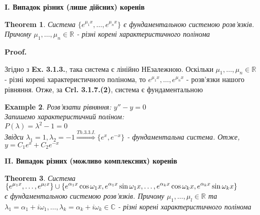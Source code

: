 \documentclass[a4paper, 10pt]{article}
\makeatletter
\def\qed{$\blacksquare$}
\theoremstyle{theoremdd}
\newtheorem{theorem}{Theorem}[subsection]
\theoremstyle{theoremdd}
\theoremstyle{theoremdd}
\theoremstyle{theoremdd}
\newtheorem{example}[theorem]{Example}
\theoremstyle{theoremdd}
\theoremstyle{theoremdd}
\theoremstyle{theoremdd}
\theoremstyle{theoremdd}
\renewenvironment{proof}[1][Proof.\\]{\par
\pushQED{\hfill \qed}%
\normalfont \topsep6\p@\@plus6\p@\relax
\trivlist
\item\relax
{\bfseries
#1\@addpunct{.}}\hspace\labelsep\ignorespaces
}{%
\popQED\endtrivlist\@endpefalse
}
\makeatother
\begin{document}
\textbf{I. Випадок різних (лише дійсних) коренів}
\begin{theorem}
 Система $\displaystyle \{e^{\mu_1 x}, \dots, e^{\mu_n x}\}$ є фундаментальною системою розв'язків. Причому $\mu_1, \dots, \mu_n \in \mathbb{R}$ - різні корені характеристичного полінома
\end{theorem}

\begin{proof}
Згідно з \textbf{Ex. 3.1.3.}, така система є лінійно НЕзалежною. Оскільки $\mu_1, \dots, \mu_n \in \mathbb{R}$ - різні корені характеристичного полінома, то $e^{\mu_1 x}, \dots, e^{\mu_n x}$ - розв'язки нашого рівняння. Отже, за \textbf{Crl. 3.1.7.(2)}, система є фундаментальною 
\end{proof}

\begin{example}
Розв'язати рівняння: $y'' - y = 0$\\
Запишемо характеристичний поліном:\\
$P(\lambda) = \lambda^2 - 1 = 0$\\
Звідси $\lambda_1 = 1, \lambda_2 = -1 \overset{Th. 3.3.I.}{\Rightarrow} \{e^x, e^{-x}\}$ - фундаментальна система.
Отже, $y = C_1e^x + C_2e^{-x}$
\end{example}

\textbf{II. Випадок різних (можливо комплексних) коренів}
\begin{theorem}
 Система $\\ \displaystyle \{e^{\mu_1 x}, \dots, e^{\mu_l x}\} \cup \{e^{\alpha_1 x} \cos \omega_1 x, e^{\alpha_1 x} \sin \omega_1 x, \dots, e^{\alpha_k x} \cos \omega_k x, e^{\alpha_k x} \sin \omega_k x\}$ \\ є фундаментальною системою розв'язків. Причому $\mu_1, \dots, \mu_l \in \mathbb{R}$ та $\lambda_1 = \alpha_1 + i\omega_1, \dots, \lambda_k = \alpha_k + i\omega_k \in \mathbb{C}$ - різні корені характеристичного полінома
\end{theorem}
\end{document}
